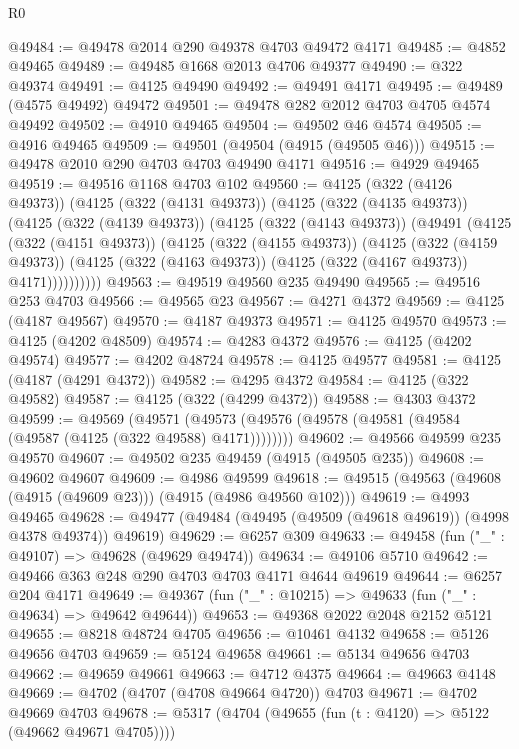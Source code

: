 \begin{lexlean}{R0}
\begin{coremodule}
@49484 := @49478 @2014 @290 @49378 @4703 @49472 @4171
@49485 := @4852 @49465
@49489 := @49485 @1668 @2013 @4706 @49377
@49490 := @322 @49374
@49491 := @4125 @49490
@49492 := @49491 @4171
@49495 := @49489 (@4575 @49492) @49472
@49501 := @49478 @282 @2012 @4703 @4705 @4574 @49492
@49502 := @4910 @49465
@49504 := @49502 @46 @4574
@49505 := @4916 @49465
@49509 := @49501 (@49504 (@4915 (@49505 @46)))
@49515 := @49478 @2010 @290 @4703 @4703 @49490 @4171
@49516 := @4929 @49465
@49519 := @49516 @1168 @4703 @102
@49560 := @4125
    (@322 (@4126 @49373))
    (@4125
      (@322 (@4131 @49373))
      (@4125
        (@322 (@4135 @49373))
        (@4125
          (@322 (@4139 @49373))
          (@4125
            (@322 (@4143 @49373))
            (@49491
              (@4125
                (@322 (@4151 @49373))
                (@4125
                  (@322 (@4155 @49373))
                  (@4125
                    (@322 (@4159 @49373))
                    (@4125 (@322 (@4163 @49373)) (@4125 (@322 (@4167 @49373)) @4171))))))))))
@49563 := @49519 @49560 @235 @49490
@49565 := @49516 @253 @4703
@49566 := @49565 @23
@49567 := @4271 @4372
@49569 := @4125 (@4187 @49567)
@49570 := @4187 @49373
@49571 := @4125 @49570
@49573 := @4125 (@4202 @48509)
@49574 := @4283 @4372
@49576 := @4125 (@4202 @49574)
@49577 := @4202 @48724
@49578 := @4125 @49577
@49581 := @4125 (@4187 (@4291 @4372))
@49582 := @4295 @4372
@49584 := @4125 (@322 @49582)
@49587 := @4125 (@322 (@4299 @4372))
@49588 := @4303 @4372
@49599 := @49569
    (@49571 (@49573 (@49576 (@49578 (@49581 (@49584 (@49587 (@4125 (@322 @49588) @4171))))))))
@49602 := @49566 @49599 @235 @49570
@49607 := @49502 @235 @49459 (@4915 (@49505 @235))
@49608 := @49602 @49607
@49609 := @4986 @49599
@49618 := @49515 (@49563 (@49608 (@4915 (@49609 @23))) (@4915 (@4986 @49560 @102)))
@49619 := @4993 @49465
@49628 := @49477 (@49484 (@49495 (@49509 (@49618 @49619)) (@4998 @4378 @49374)) @49619)
@49629 := @6257 @309
@49633 := @49458 (fun ("_" : @49107) => @49628 (@49629 @49474))
@49634 := @49106 @5710
@49642 := @49466 @363 @248 @290 @4703 @4703 @4171 @4644 @49619
@49644 := @6257 @204 @4171
@49649 := @49367 (fun ("_" : @10215) => @49633 (fun ("_" : @49634) => @49642 @49644))
@49653 := @49368 @2022 @2048 @2152 @5121
@49655 := @8218 @48724 @4705
@49656 := @10461 @4132
@49658 := @5126 @49656 @4703
@49659 := @5124 @49658
@49661 := @5134 @49656 @4703
@49662 := @49659 @49661
@49663 := @4712 @4375
@49664 := @49663 @4148
@49669 := @4702 (@4707 (@4708 @49664 @4720)) @4703
@49671 := @4702 @49669 @4703
@49678 := @5317 (@4704 (@49655 (fun (t : @4120) => @5122 (@49662 @49671 @4705))))

\end{coremodule}
\end{lexlean}
